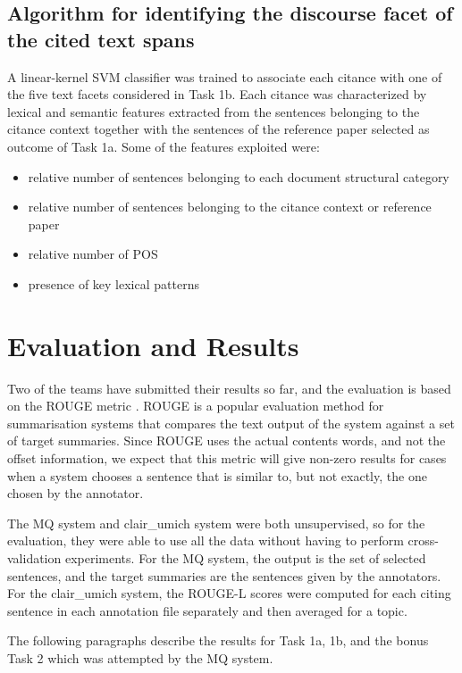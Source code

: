 \documentclass[11pt]{article}
\begin{document}
\subsection{Algorithm for identifying the discourse facet of the 
											cited text spans}
A linear-kernel SVM classifier was trained to associate each citance with one
 of the five text facets considered in Task 1b. Each citance was characterized 
 by lexical and semantic features extracted from the sentences belonging to 
 the citance context together with the sentences of the reference paper 
 selected as outcome of Task 1a.
Some of the features exploited were:
\begin{itemize}
\item{relative number of sentences belonging to each document structural 
		category}
\item{relative number of sentences belonging to the citance context or 
		reference paper}
\item{relative number of POS}
\item{presence of key lexical patterns}
\end{itemize}

\section{Evaluation and Results}
Two of the teams have submitted their results so far, and the evaluation 
is based on the ROUGE metric \cite{Lin:2004}. ROUGE is a popular evaluation
 method for summarisation systems that compares the text output of the system 
 against a set of target summaries. Since ROUGE uses the actual contents words, 
 and not the offset information, we expect that this metric will give non-zero 
 results for cases when a system chooses a sentence that is similar to, but not 
 exactly, the one chosen by the annotator.

The MQ system and clair\_umich system were both unsupervised, so for the 
evaluation, they were able to use all the data without having to perform 
cross-validation experiments. For the MQ system, the output is the set of 
selected sentences, and the target summaries are the sentences given by the 
annotators.  For the clair\_umich system, the ROUGE-L scores were computed for 
each citing sentence in each annotation file separately and then averaged for 
a topic.


The following paragraphs describe the results for Task 1a, 1b, and the bonus 
Task 2 which was attempted by the MQ system. 
\end{document}
